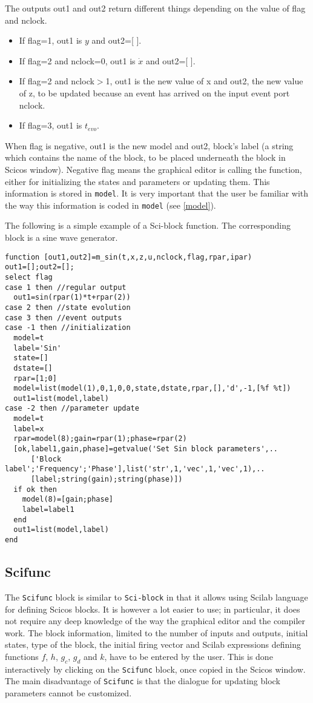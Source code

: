 The outputs out1 and out2 return different things depending on the
value of flag and nclock. 
\begin{itemize}
\item If flag=1, out1 is $y$ and out2=[ ].
\item If flag=2 and nclock=0, out1 is $\dot{x}$ and out2=[ ]. 
\item If flag=2 and nclock$>$1, out1 is the new value of x and out2,
the new value of z, to be updated because an event has arrived on the input
event port nclock.  
\item If flag=3, out1 is $t_{evo}$. 
\end{itemize}
When flag is negative, out1 is the new model and out2, block's label (a
string which contains the name of the block, to be placed underneath
the block in Scicos  window). Negative flag means
the graphical editor is calling the function, either for
initializing the states and parameters or updating them. This
information is stored in {\tt model}. It is very important that the user be
familiar with the way this information is coded in {\tt model} (see \ref{model}).

The following is a simple example of a Sci-block function. The
corresponding block is a sine wave generator. 

\begin{verbatim}
function [out1,out2]=m_sin(t,x,z,u,nclock,flag,rpar,ipar)
out1=[];out2=[];
select flag
case 1 then //regular output
  out1=sin(rpar(1)*t+rpar(2))
case 2 then //state evolution
case 3 then //event outputs
case -1 then //initialization
  model=t
  label='Sin'
  state=[]
  dstate=[]
  rpar=[1;0]
  model=list(model(1),0,1,0,0,state,dstate,rpar,[],'d',-1,[%f %t])
  out1=list(model,label)
case -2 then //parameter update
  model=t
  label=x
  rpar=model(8);gain=rpar(1);phase=rpar(2)
  [ok,label1,gain,phase]=getvalue('Set Sin block parameters',..
      ['Block label';'Frequency';'Phase'],list('str',1,'vec',1,'vec',1),..
      [label;string(gain);string(phase)])
  if ok then
    model(8)=[gain;phase]
    label=label1
  end
  out1=list(model,label)
end

\end{verbatim}


\subsection{Scifunc}
The {\tt Scifunc} block is similar to {\tt Sci-block} in that it
allows using Scilab language for defining Scicos   blocks. It is however
a lot easier to use; in particular, it does not require any deep
knowledge of the way the graphical editor and the compiler work. The
block information, limited to the number of inputs and outputs, initial
states, type of the block, the initial firing vector and Scilab
expressions defining functions $f$, $h$, $g_c$, $g_d$ and $k$, have to
be entered by the user. This is done interactively by clicking on the
{\tt Scifunc} block, once copied in the Scicos   window. The main
disadvantage of {\tt Scifunc} is that the dialogue for updating block
parameters cannot be customized. 

